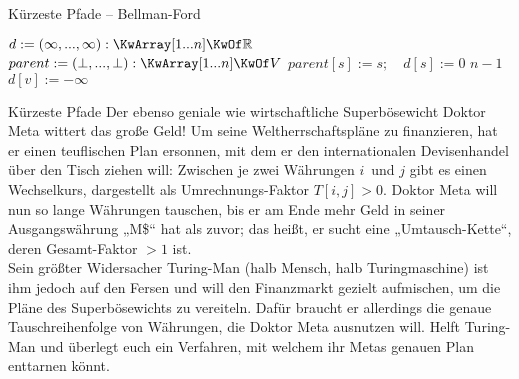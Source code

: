 \begin{frame}{Kürzeste Pfade – Bellman-Ford}
	\begin{exampleblock}{}
		\begin{algorithm}[H]
			\small
			 {
				$d := (\infty, ..., \infty) : \KwArray[1...n] \KwOf \R$\;
				$parent := (\bot, ..., \bot) : \KwArray[1...n] \KwOf V$\;
				$parent[s] := s ; \quad d[s] := 0$ \;
				 $n-1$  
				 {
					 {
						$d[v] := -\infty$\;
					}
				}
				\;
			}
		\end{algorithm}
	\end{exampleblock}
\end{frame}

\begin{frame}{Kürzeste Pfade}
	\taskheading{}
	Der ebenso geniale wie wirtschaftliche Superbösewicht Doktor Meta wittert das große Geld! Um seine Weltherrschaftspläne zu finanzieren, hat er einen teuflischen Plan ersonnen, mit dem er den internationalen Devisenhandel über den Tisch ziehen will: Zwischen je zwei Währungen $i$~und $j$ gibt es einen Wechselkurs, dargestellt als Umrechnungs-Faktor $T[i,j] > 0$. Doktor Meta will nun so lange Währungen tauschen, bis er am Ende mehr Geld in seiner Ausgangswährung „M\$“ hat als zuvor; das heißt, er sucht eine „Umtausch-Kette“, deren Gesamt-Faktor $> 1$ ist. \\
	\smallskip
	Sein größter Widersacher Turing-Man {\small (halb Mensch, halb Turingmaschine)} ist ihm jedoch auf den Fersen und will den Finanzmarkt gezielt aufmischen, um die Pläne des Superbösewichts zu vereiteln. Dafür braucht er allerdings die genaue Tauschreihenfolge von Währungen, die Doktor Meta ausnutzen will. Helft Turing-Man und  überlegt euch ein Verfahren, mit welchem ihr Metas genauen Plan enttarnen könnt.
\end{frame}

